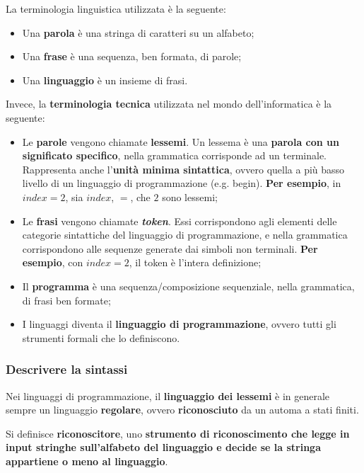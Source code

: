 \documentclass[a4paper]{article}
\begin{document}
	\noindent
	La terminologia linguistica utilizzata è la seguente:
	\begin{itemize}
		\item Una \textbf{parola} è una stringa di caratteri su un alfabeto;
		\item Una \textbf{frase} è una sequenza, ben formata, di parole;
		\item Una \textbf{linguaggio} è un insieme di frasi.
	\end{itemize}
	Invece, la \textbf{terminologia tecnica} utilizzata nel mondo dell'informatica è la seguente:
	\begin{itemize}
		\item Le \textbf{parole} vengono chiamate \textcolor{Red3}{\textbf{lessemi}}. Un lessema è una \textbf{parola con un significato specifico}, nella grammatica corrisponde ad un terminale. Rappresenta anche l'\textbf{unità minima sintattica}, ovvero quella a più basso livello di un linguaggio di programmazione (e.g. \textsf{begin}). \textbf{Per esempio}, in $index = 2$, sia $index$, $=$, che $2$ sono lessemi;
		\item Le \textbf{frasi} vengono chiamate \textcolor{Red3}{\textbf{\emph{token}}}. Essi corrispondono agli elementi delle categorie sintattiche del linguaggio di programmazione, e nella grammatica corrispondono alle sequenze generate dai simboli non terminali. \textbf{Per esempio}, con $index = 2$, il token è l'intera definizione;
		\item Il \textcolor{Red3}{\textbf{programma}} è una sequenza/composizione sequenziale, nella grammatica, di frasi ben formate;
		\item I linguaggi diventa il \textcolor{Red3}{\textbf{linguaggio di programmazione}}, ovvero tutti gli strumenti formali che lo definiscono.
	\end{itemize}\newpage

	\subsubsection{Descrivere la sintassi}

	Nei linguaggi di programmazione, il \textbf{linguaggio dei lessemi} è in generale sempre un linguaggio \textbf{regolare}, ovvero \textbf{riconosciuto} da un automa a stati finiti.
	\begin{boxdef}
		Si definisce \textcolor{Red3}{\textbf{riconoscitore}}, uno \textbf{strumento di riconoscimento che legge in input stringhe sull'alfabeto del linguaggio e decide se la stringa appartiene o meno al linguaggio}.
	\end{boxdef}
	
\end{document}
